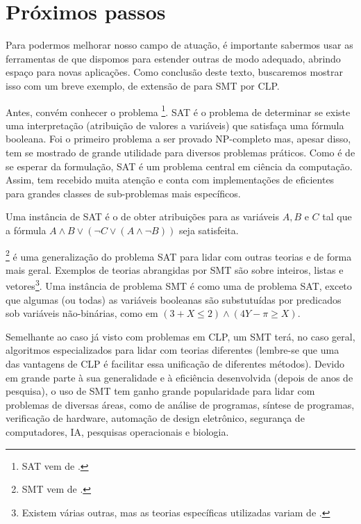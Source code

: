 \documentclass{article}
\begin{document}
\section{Próximos passos}

Para podermos melhorar nosso campo de atuação, é importante sabermos
usar as ferramentas de que dispomos para estender outras de modo
adequado, abrindo espaço para novas aplicações. Como conclusão deste
texto, buscaremos mostrar isso com um breve exemplo, de extensão de
 para SMT por CLP.

Antes, convém conhecer o problema  \footnote{SAT
  vem de .}. SAT é o problema de
determinar se existe uma interpretação (atribuição de
valores  a variáveis) que
satisfaça uma fórmula booleana. Foi o primeiro
problema a ser provado NP-completo\cite{schaefer} mas, apesar disso,
tem se mostrado
de grande utilidade para diversos problemas práticos. Como é de se
esperar da formulação, SAT é um problema central em ciência da
computação. Assim, tem recebido muita atenção e conta com
implementações de  eficientes para grandes classes de
sub-problemas mais específicos.

Uma instância de SAT é o de obter atribuições para as variáveis $A, B$
e $C$ tal que a fórmula $A \wedge B \vee (\neg C \vee (A \wedge \neg B))$ seja satisfeita.

\footnote{SMT vem de
  .} é uma generalização do
problema SAT para lidar com outras teorias e de forma mais
geral. Exemplos de teorias abrangidas por SMT são sobre inteiros,
listas e vetores\footnote{Existem várias outras, mas as teorias
  específicas utilizadas variam de .}. Uma instância
de problema SMT é como uma de problema SAT, exceto que algumas (ou
todas) as variáveis booleanas são substutuídas por predicados sob
variáveis não-binárias, como em $(3 + X \leq 2) \wedge (4Y - \pi \geq X)$.

Semelhante ao caso já visto com problemas em CLP, um 
SMT terá, no caso
geral, algoritmos especializados para lidar com teorias diferentes
(lembre-se que uma das vantagens de CLP é facilitar essa unificação de
diferentes métodos). Devido em grande parte à sua generalidade e
à eficiência desenvolvida (depois de anos de pesquisa), o uso de
 SMT tem ganho grande
popularidade para lidar com problemas de diversas áreas, como de
análise de programas\cite{zheng}, síntese de programas\cite{beyene},
verificação de hardware\cite{kroenig}, automação de design
eletrônico\cite{kroenig}, segurança de computadores\cite{vanegue}, IA,
pesquisas operacionais\cite{li} e biologia\cite{yordanov}.
\end{document}
